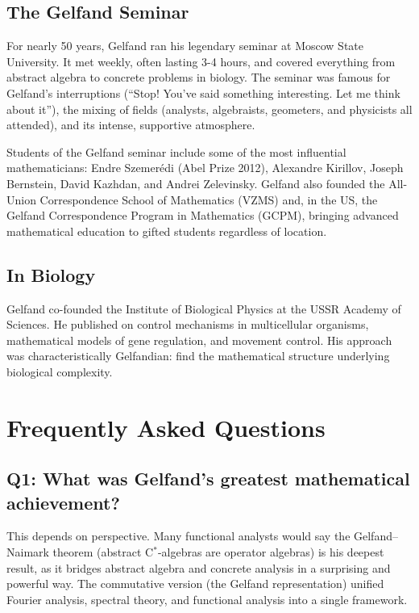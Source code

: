 \subsection{The Gelfand Seminar}

For nearly 50 years, Gelfand ran his legendary seminar at Moscow State University. It met weekly, often lasting 3-4 hours, and covered everything from abstract algebra to concrete problems in biology. The seminar was famous for Gelfand's interruptions (``Stop! You've said something interesting. Let me think about it''), the mixing of fields (analysts, algebraists, geometers, and physicists all attended), and its intense, supportive atmosphere.

Students of the Gelfand seminar include some of the most influential mathematicians: Endre Szemer\'{e}di (Abel Prize 2012), Alexandre Kirillov, Joseph Bernstein, David Kazhdan, and Andrei Zelevinsky. Gelfand also founded the All-Union Correspondence School of Mathematics (VZMS) and, in the US, the Gelfand Correspondence Program in Mathematics (GCPM), bringing advanced mathematical education to gifted students regardless of location.

\subsection{In Biology}

Gelfand co-founded the Institute of Biological Physics at the USSR Academy of Sciences. He published on control mechanisms in multicellular organisms, mathematical models of gene regulation, and movement control. His approach was characteristically Gelfandian: find the mathematical structure underlying biological complexity.

\section{Frequently Asked Questions}

\subsection*{Q1: What was Gelfand's greatest mathematical achievement?}

This depends on perspective. Many functional analysts would say the Gelfand--Naimark theorem (abstract C$^*$-algebras are operator algebras) is his deepest result, as it bridges abstract algebra and concrete analysis in a surprising and powerful way. The commutative version (the Gelfand representation) unified Fourier analysis, spectral theory, and functional analysis into a single framework.

